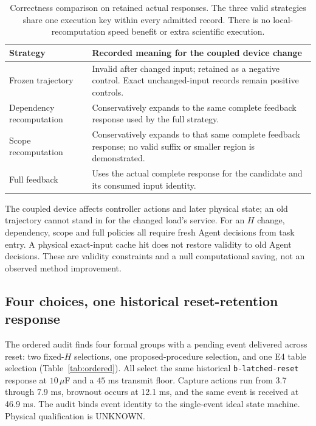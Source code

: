 \begin{table}[htbp]
\centering
\begin{tabular}{@{}lp{10.6cm}@{}}
\toprule
Strategy & Recorded meaning for the coupled device change \\
\midrule
Frozen trajectory & Invalid after changed input; retained as a negative control.
Exact unchanged-input records remain positive controls. \\
Dependency recomputation & Conservatively expands to the same complete feedback
response used by the full strategy. \\
Scope recomputation & Conservatively expands to that same complete feedback
response; no valid suffix or smaller region is demonstrated. \\
Full feedback & Uses the actual complete response for the candidate and its
consumed input identity. \\
\bottomrule
\end{tabular}
\caption{Correctness comparison on retained actual responses. The three valid
strategies share one execution key within every admitted record. There is no
local-recomputation speed benefit or extra scientific execution.}
\label{tab:scope}
\end{table}

The coupled device affects controller actions and later physical state; an old
trajectory cannot stand in for the changed load's service. For an $H$ change,
dependency, scope and full policies all require fresh Agent decisions from
task entry. A physical exact-input cache hit does not restore validity to old
Agent decisions. These are validity constraints and a null computational
saving, not an observed method improvement.

\subsection{Four choices, one historical reset-retention response}
The ordered audit finds four formal groups with a pending event delivered
across reset: two fixed-$H$ selections, one proposed-procedure selection, and
one E4 table selection (Table~\ref{tab:ordered}). All select the same historical
\texttt{b-latched-reset} response at $10\,\mu$F and a $45$ ms transmit floor.
Capture actions run from 3.7 through 7.9 ms, brownout occurs at 12.1 ms, and
the same event is received at 46.9 ms. The audit binds event identity to the
single-event ideal state machine. Physical qualification is UNKNOWN.

